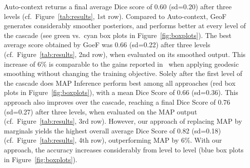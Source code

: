 \documentclass[10pt,twocolumn,letterpaper]{article}
\begin{document}
Auto-context returns a final average Dice score of 0.60 (sd=0.20) after three levels (cf.\ Figure~\ref{tab:results}, 1st row). 
%
Compared to Auto-context, GeoF generates considerably smoother posteriors, and performs better at every level of the cascade (see green vs.\ cyan box plots in Figure~\ref{fig:boxplots}). The best average score obtained by GoeF was 0.66 (sd=0.22) after three levels  (cf.\ Figure~\ref{tab:results}, 2nd row), when evaluated on its smoothed output. This increase of 6\% is comparable to the gains reported in~\cite{GeoForests2013} when applying geodesic smoothing without changing the training objective.
%
Solely after the first level of the cascade does MAP Inference perform best among all approaches (red box plots in Figure~\ref{fig:boxplots}), with a mean Dice Score of 0.66 (sd=0.36). This approach also improves over the cascade, reaching a final Dice Score of 0.76 (sd=0.27) after three levels, when evaluated on the MAP output (cf.\ Figure~\ref{tab:results}, 3rd row). 
%
However, our approach of replacing MAP by marginals yields the highest overall average Dice Score of 0.82 (sd=0.18) (cf.\ Figure~\ref{tab:results}, 4th row), outperforming MAP by 6\%. 
%
With our approach, the accuracy increases considerably from level to level (blue box plots in Figure~\ref{fig:boxplots}). 
\end{document}
